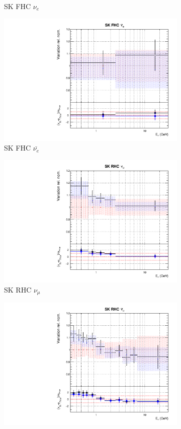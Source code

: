 \begin{figure}
\begin{subfigure}{0.24\textwidth}
  \caption{SK FHC $\nu_{e}$}
\end{subfigure}
\begin{subfigure}{0.24\textwidth}
  \centering
  \includegraphics[width=0.95\linewidth]{figs/comp5q2vs8q2flux11}
  \caption{SK FHC $\bar{\nu_{e}}$}
\end{subfigure}
\begin{subfigure}{0.24\textwidth}
  \centering
  \includegraphics[width=0.95\linewidth]{figs/comp5q2vs8q2flux12}
  \caption{SK RHC $\nu_{\mu}$}
\end{subfigure}
\begin{subfigure}{0.24\textwidth}
  \centering
  \includegraphics[width=0.95\linewidth]{figs/comp5q2vs8q2flux13}

\end{subfigure}
\end{figure}
